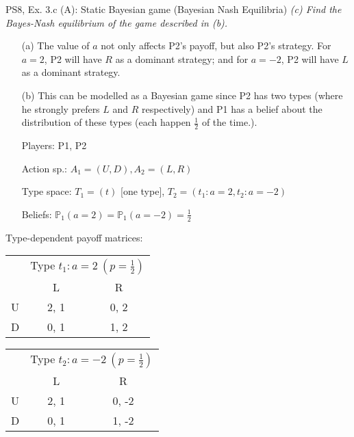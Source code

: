 \begin{frame}{PS8, Ex. 3.c (A): Static Bayesian game (Bayesian Nash Equilibria)}
    \textit{(c) Find the Bayes-Nash equilibrium of the game described in (b).}
    \vspace{-8pt}
    \begin{multicols}{2}
      \begin{itemize}
      \item[(a)] The value of $a$ not only affects P2's payoff, but also P2's strategy. For $a=2$, P2 will have $R$ as a dominant strategy; and for $a=-2$, P2 will have $L$ as a dominant strategy.
      \item[(b)] This can be modelled as a Bayesian game since P2 has two types (where he strongly prefers $L$ and $R$ respectively) and P1 has a belief about the distribution of these types (each happen $\frac{1}{2}$ of the time.).
          \item[Players:] P1, P2
          \item[Action sp.:] $A_1=(U,D),A_2=(L,R)$
          \item[Type space:] $T_1=(t)$ [one type], $T_2=(t_1:a=2,t_2:a=-2)$
          \item[Beliefs:] $\mathbb{P}_1(a=2)=\mathbb{P}_1(a=-2)=\frac{1}{2}$
      \end{itemize}
      \vfill\null\columnbreak
      Type-dependent payoff matrices:
      \vspace{-8pt}
      \begin{table}
          \begin{tabular}{l|c|c|}
          \multicolumn{1}{c}{} & \multicolumn{2}{c}{Type $t_1:a=2\ (p=\frac{1}{2})$} \\
          \multicolumn{1}{c}{} & \multicolumn{1}{c}{L} & \multicolumn{1}{c}{R} \\\cline{2-3}
          U & 2, 1 & 0, 2 \\\cline{2-3}
          D & 0, 1 & 1, 2 \\\cline{2-3}
        \end{tabular}
      \end{table}
      \vspace{-8pt}
      \begin{table}
        \begin{tabular}{l|c|c|}
          \multicolumn{1}{c}{} & \multicolumn{2}{c}{Type $t_2:a=-2\ (p=\frac{1}{2})$} \\
          \multicolumn{1}{c}{} & \multicolumn{1}{c}{L} & \multicolumn{1}{c}{R} \\\cline{2-3}
          U & 2, 1 & 0, -2 \\\cline{2-3}
          D & 0, 1 & 1, -2 \\\cline{2-3}
        \end{tabular}
      \end{table}
      \vfill\null
    \end{multicols}
\end{frame}
